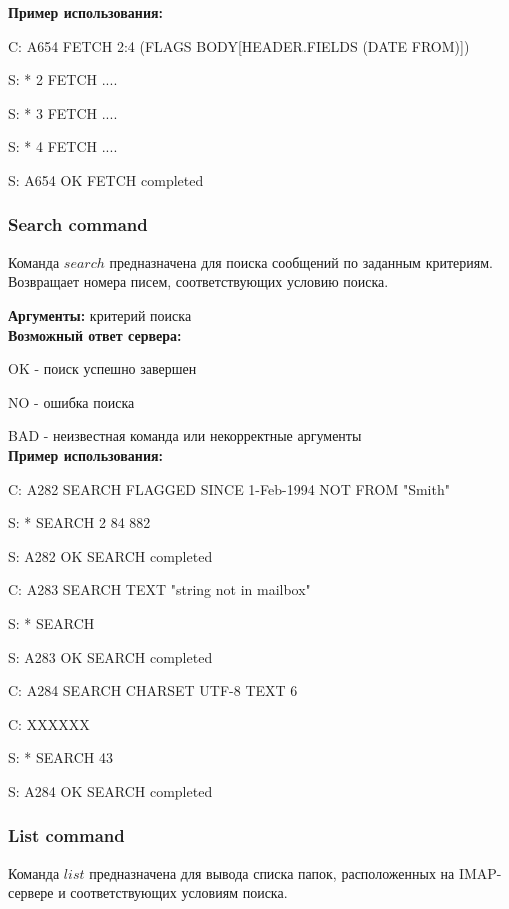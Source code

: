 \documentclass[a4paper,14pt]{extarticle}
\begin{document}
        \textbf{Пример использования:}  

        C: A654 FETCH 2:4 (FLAGS BODY[HEADER.FIELDS (DATE FROM)])

        S: * 2 FETCH ....

        S: * 3 FETCH ....

        S: * 4 FETCH ....

        S: A654 OK FETCH completed


    \subsubsection{Search command}

        Команда $search$ предназначена для поиска сообщений по заданным критериям.
        Возвращает номера писем, соответствующих условию поиска.

        \textbf{Аргументы:}  критерий поиска \\

        \textbf{Возможный ответ сервера:}

        OK - поиск успешно завершен

        NO - ошибка поиска

        BAD - неизвестная команда или некорректные аргументы \\


        \textbf{Пример использования:}  

        C: A282 SEARCH FLAGGED SINCE 1-Feb-1994 NOT FROM "Smith"

        S: * SEARCH 2 84 882

        S: A282 OK SEARCH completed

        C: A283 SEARCH TEXT "string not in mailbox"

        S: * SEARCH

        S: A283 OK SEARCH completed

        C: A284 SEARCH CHARSET UTF-8 TEXT {6}

        C: XXXXXX

        S: * SEARCH 43

        S: A284 OK SEARCH completed


    \subsubsection{List command}

        Команда $list$ предназначена для вывода
        списка папок, расположенных на IMAP-сервере
        и соответствующих условиям поиска.
\end{document}
